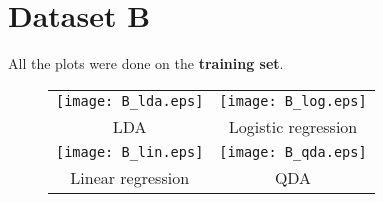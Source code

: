 \documentclass[a4paper,11pt]{article}
\begin{document}
\newpage
\section*{Dataset B}
All the plots were done on the \textbf{training set}.
\begin{figure}[h!]
\centering
\begin{tabular}{cc}
  \texttt{[image: B\_lda.eps]} &   \texttt{[image: B\_log.eps]} \\
LDA & Logistic regression \\[6pt]
 \texttt{[image: B\_lin.eps]} &   \texttt{[image: B\_qda.eps]} \\
Linear regression & QDA \\[6pt]
\end{tabular}
\end{figure}
\end{document}
